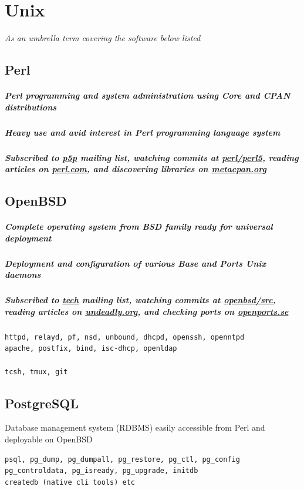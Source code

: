 \documentclass {article}
\begin{document}
  \section{Unix} %
    \textit{As an umbrella term covering the software below listed}

    \subsection{Perl}
      \subparagraph{Perl programming and system administration using Core and CPAN distributions}
      \subparagraph{Heavy use and avid interest in Perl programming language system}
      \subparagraph{Subscribed to \href{https://lists.perl.org/list/perl5-porters.html}{p5p} mailing list, watching commits at \href{https://github.com/Perl/perl5}{perl/perl5}, reading articles on \href{https://perl.com/}{perl.com}, and discovering libraries on \href{https://metacpan.org/}{metacpan.org}}

    \subsection{OpenBSD}
      \subparagraph{Complete operating system from BSD family ready for universal deployment}
      \subparagraph{Deployment and configuration of various Base and Ports Unix daemons}
      \subparagraph{Subscribed to \href{https://www.openbsd.org/mail.html}{tech} mailing list, watching commits at \href{https://github.com/openbsd/src}{openbsd/src}, reading articles on \href{https://undeadly.org//}{undeadly.org}, and checking ports on \href{https://openports.se/}{openports.se}}
      \begin{verbatim}
httpd, relayd, pf, nsd, unbound, dhcpd, openssh, openntpd
apache, postfix, bind, isc-dhcp, openldap

tcsh, tmux, git
   \end{verbatim}

    \subsection{PostgreSQL}
      Database management system (RDBMS) easily accessible from Perl and deployable on OpenBSD
      \begin{verbatim}
psql, pg_dump, pg_dumpall, pg_restore, pg_ctl, pg_config
pg_controldata, pg_isready, pg_upgrade, initdb
createdb (native cli tools) etc
  \end{verbatim}
\end{document}

